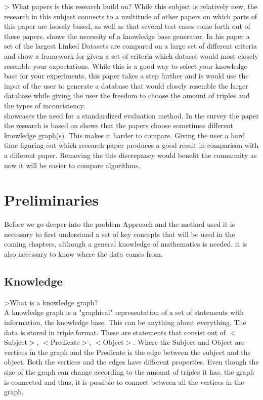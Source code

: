 \documentclass{article}
\begin{document}
> What papers is this research build on?
While this subject is relatively new, the research in this subject connects to a multitude of other papers on which parts of this paper are loosely based, as well as that several test cases come forth out of these papers. \cite{MichaelF:2017} shows the necessity of a knowledge base generator. In his paper a set of the largest Linked Datasets are compared on a large set of different criteria and show a framework for given a set of criteria which dataset would most closely resemble your expectations. While this is a good way to select your knowledge base for your experiments, this paper takes a step further and is would use the input of the user to generate a database that would closely resemble the larger database while giving the user the freedom to choose the amount of triples and the types of inconsistency.\\
\cite{HeikoP:2016} showcases the need for a standardized evaluation method. In the survey the paper the research is based on shows that the papers choose sometimes different knowledge graph(s). This makes it harder to compare. Giving the user a hard time figuring out which research paper produces a good result in comparison with a different paper. Removing the this discrepancy would benefit the community as now it will be easier to compare algorithms.



\newpage
\section{Preliminaries}
Before we go deeper into the problem Approach and the method used it is necessary to first understand a set of key concepts that will be used in the coming chapters, although a general knowledge of mathematics is needed. it is also necessary to know where the data comes from.

\subsection{Knowledge}
>What is a knowledge graph?\\
A knowledge graph is a "graphical" representation of a set of statements with information, the knowledge base. This can be anything about everything. The data is stored in triple format. These are statements that consist out of $<$Subject$>$, $<$Predicate$>$, $<$Object$>$. Where the Subject and Object are vertices in the graph and the Predicate is the edge between the subject and the object. Both the vertices and the edges have different properties. Even though the size of the graph can change according to the amount of triples it has, the graph is connected and thus, it is possible to connect between all the vertices in the graph. 
\end{document}
